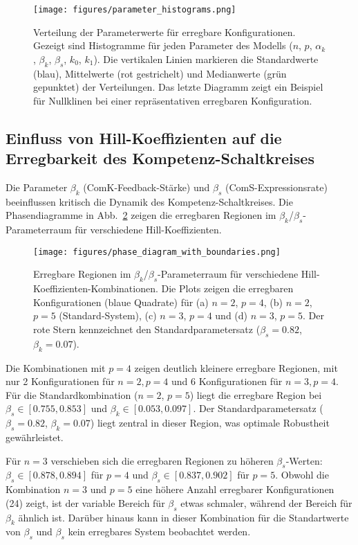 \documentclass[11pt]{article}
\begin{document}
\begin{figure}[h]
    \centering
    \texttt{[image: figures/parameter\_histograms.png]}
    \caption{Verteilung der Parameterwerte für erregbare Konfigurationen. Gezeigt sind Histogramme für jeden Parameter des Modells ($n$, $p$, $\alpha_k$, $\beta_k$, $\beta_s$, $k_0$, $k_1$). Die vertikalen Linien markieren die Standardwerte (blau), Mittelwerte (rot gestrichelt) und Medianwerte (grün gepunktet) der Verteilungen. Das letzte Diagramm zeigt ein Beispiel für Nullklinen bei einer repräsentativen erregbaren Konfiguration.}
    \label{fig:param_histograms}
\end{figure}

\subsection{Einfluss von Hill-Koeffizienten auf die Erregbarkeit des Kompetenz-Schaltkreises}
Die Parameter $\beta_k$ (ComK-Feedback-Stärke) und $\beta_s$ (ComS-Expressionsrate) beeinflussen kritisch die Dynamik des Kompetenz-Schaltkreises. Die Phasendiagramme in Abb.~\ref{fig:phase-bk-bs} zeigen die erregbaren Regionen im $\beta_k$/$\beta_s$-Parameterraum für verschiedene Hill-Koeffizienten.

\begin{figure}
    \centering
    \texttt{[image: figures/phase\_diagram\_with\_boundaries.png]}
    \caption{Erregbare Regionen im $\beta_k$/$\beta_s$-Parameterraum für verschiedene Hill-Koeffizienten-Kombinationen. Die Plots zeigen die erregbaren Konfigurationen (blaue Quadrate) für (a) $n=2$, $p=4$, (b) $n=2$, $p=5$ (Standard-System), (c) $n=3$, $p=4$ und (d) $n=3$, $p=5$. Der rote Stern kennzeichnet den Standardparametersatz ($\beta_s=0.82$, $\beta_k=0.07$).}
    \label{fig:phase-bk-bs}
\end{figure}

Die Kombinationen mit $p=4$ zeigen deutlich kleinere erregbare Regionen, mit nur 2 Konfigurationen für $n=2, p=4$ und 6 Konfigurationen für $n=3, p=4$.
Für die Standardkombination ($n=2$, $p=5$) liegt die erregbare Region bei $\beta_s \in [0.755, 0.853]$ und $\beta_k \in [0.053, 0.097]$. Der Standardparametersatz ($\beta_s=0.82$, $\beta_k=0.07$) liegt zentral in dieser Region, was optimale Robustheit gewährleistet.

Für $n=3$ verschieben sich die erregbaren Regionen zu höheren $\beta_s$-Werten: $\beta_s \in [0.878, 0.894]$ für $p=4$ und $\beta_s \in [0.837, 0.902]$ für $p=5$.
Obwohl die Kombination $n=3$ und $p=5$ eine höhere Anzahl erregbarer Konfigurationen (24) zeigt, ist der variable Bereich für $\beta_s$ etwas schmaler, während der Bereich für $\beta_k$ ähnlich ist. Darüber hinaus kann in dieser Kombination für die Standartwerte von $\beta_s$ und $\beta_s$ kein erregbares System beobachtet werden.
\end{document}

